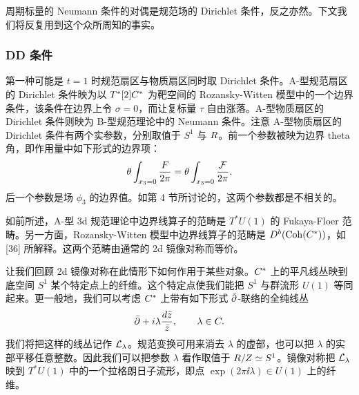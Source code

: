 周期标量的 Neumann 条件的对偶是规范场的 Dirichlet 条件，反之亦然。下文我们将反复用到这个众所周知的事实。

\subsubsection{DD 条件}

第一种可能是 $t=1$ 时规范扇区与物质扇区同时取 Dirichlet 条件。A-型规范扇区的 Dirichlet 条件映为以 $T^*[2]C^*$ 为靶空间的 Rozansky-Witten 模型中的一个边界条件，该条件在边界上令 $\sigma=0$，而让复标量 $\tau$ 自由涨落。A-型物质扇区的 Dirichlet 条件则映为 B-型规范理论中的 Neumann 条件。注意 A-型物质扇区的 Dirichlet 条件有两个实参数，分别取值于 $S^1$ 与 $R$。前一个参数被映为边界 theta 角，即作用量中如下形式的边界项：
\[
  \theta\int_{x_3=0}\frac{F}{2\pi}
  =\theta\int_{x_3=0}\frac{\mathcal{F}}{2\pi}.
\]
后一个参数是场 $\phi_3$ 的边界值。如第 4 节所讨论的，这两个参数都是不相关的。



如前所述，A-型 3d 规范理论中边界线算子的范畴是 $T^*U(1)$ 的 Fukaya-Floer 范畴。另一方面，Rozansky-Witten 模型中边界线算子的范畴是 $D^b(\mathrm{Coh}(C^*))$，如 [36] 所解释。这两个范畴由通常的 2d 镜像对称而等价。

让我们回顾 2d 镜像对称在此情形下如何作用于某些对象。$C^*$ 上的平凡线丛映到底空间 $S^1$ 某个特定点上的纤维。这个特定点使我们能把 $S^1$ 与群流形 $U(1)$ 等同起来。更一般地，我们可以考虑 $C^*$ 上带有如下形式 $\bar{\partial}$-联络的全纯线丛
\[
  \bar{\partial}+i\lambda\frac{d\bar z}{\bar z},\qquad \lambda\in C .
\]
我们将把这样的线丛记作 $\mathcal{L}_\lambda$。规范变换可用来消去 $\lambda$ 的虚部，也可以把 $\lambda$ 的实部平移任意整数。因此我们可以把参数 $\lambda$ 看作取值于 $R/Z\simeq S^1$。镜像对称把 $\mathcal{L}_\lambda$ 映到 $T^*U(1)$ 中的一个拉格朗日子流形，即点 $\exp(2\pi\ii\lambda)\in U(1)$ 上的纤维。


